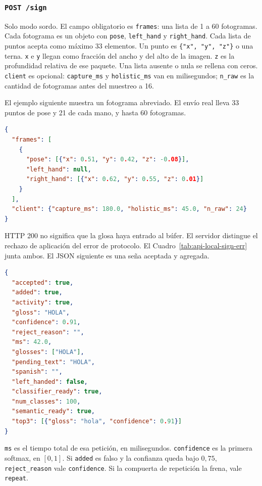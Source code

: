 \subsubsection{\texttt{POST /sign}}

Solo modo sordo. El campo obligatorio es \texttt{frames}: una lista de 1 a 60 fotogramas. Cada fotograma es un objeto con \texttt{pose}, \texttt{left\_hand} y \texttt{right\_hand}. Cada lista de puntos acepta como máximo 33 elementos. Un punto es \texttt{\{"x", "y", "z"\}} o una terna. \texttt{x} e \texttt{y} llegan como fracción del ancho y del alto de la imagen. \texttt{z} es la profundidad relativa de ese paquete. Una lista ausente o nula se rellena con ceros. \texttt{client} es opcional: \texttt{capture\_ms} y \texttt{holistic\_ms} van en milisegundos; \texttt{n\_raw} es la cantidad de fotogramas antes del muestreo a 16.

El ejemplo siguiente muestra un fotograma abreviado. El envío real lleva 33 puntos de pose y 21 de cada mano, y hasta 60 fotogramas.

\begin{lstlisting}[language=json]
{
  "frames": [
    {
      "pose": [{"x": 0.51, "y": 0.42, "z": -0.08}],
      "left_hand": null,
      "right_hand": [{"x": 0.62, "y": 0.55, "z": 0.01}]
    }
  ],
  "client": {"capture_ms": 180.0, "holistic_ms": 45.0, "n_raw": 24}
}
\end{lstlisting}

HTTP 200 no significa que la glosa haya entrado al búfer. El servidor distingue el rechazo de aplicación del error de protocolo. El Cuadro~\ref{tab:api-local-sign-err} junta ambos. El JSON siguiente es una seña aceptada y agregada.

\begin{lstlisting}[language=json]
{
  "accepted": true,
  "added": true,
  "activity": true,
  "gloss": "HOLA",
  "confidence": 0.91,
  "reject_reason": "",
  "ms": 42.0,
  "glosses": ["HOLA"],
  "pending_text": "HOLA",
  "spanish": "",
  "left_handed": false,
  "classifier_ready": true,
  "num_classes": 100,
  "semantic_ready": true,
  "top3": [{"gloss": "hola", "confidence": 0.91}]
}
\end{lstlisting}

\texttt{ms} es el tiempo total de esa petición, en milisegundos. \texttt{confidence} es la primera softmax, en $[0, 1]$. Si \texttt{added} es falso y la confianza queda bajo $0{,}75$, \texttt{reject\_reason} vale \texttt{confidence}. Si la compuerta de repetición la frena, vale \texttt{repeat}.


